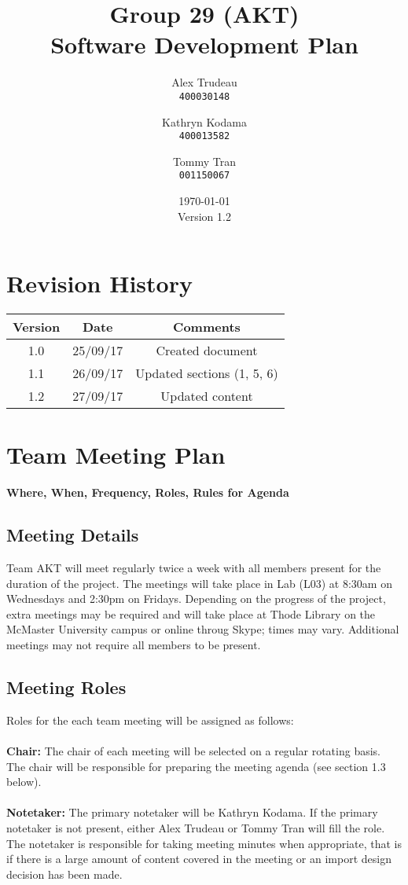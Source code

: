 \documentclass[12pt,fleqn]{article}
\title{Group 29 (AKT)\\ Software Development Plan}
\author{
Alex Trudeau\\
	\texttt{400030148}
\and
Kathryn Kodama\\
  	\texttt{400013582}
\and
Tommy Tran\\
	\texttt{001150067}
}
\date{\today\\Version 1.2}
\begin{document}
\maketitle

\pagebreak
\tableofcontents

\section* {Revision History}

\begin{tabular}{ |c| c| c| }
\hline
Version & Date & Comments \\
\hline
1.0 & 25/09/17 & Created document \\
\hline
1.1 & 26/09/17 & Updated sections (1, 5, 6) \\
\hline
1.2 & 27/09/17 & Updated content \\
\hline
\end{tabular}


\pagebreak

\section{Team Meeting Plan}
\textbf{Where, When, Frequency, Roles, Rules for Agenda}

\subsection{Meeting Details}

Team AKT will meet regularly twice a week with all members present for the duration of the project.  The meetings will take place in Lab (L03) at 8:30am on Wednesdays and 2:30pm on Fridays.  Depending on the progress of the project, extra meetings may be required and will take place at Thode Library on the McMaster University campus or online throug Skype; times may vary.  Additional meetings may not require all members to be present.

\subsection{Meeting Roles}
Roles for the each team meeting will be assigned as follows:\\ \\
\textbf{Chair:} The chair of each meeting will be selected on a regular rotating basis.  The chair will be responsible for preparing the meeting agenda (see section 1.3 below).\\ \\
\textbf{Notetaker:} The primary notetaker will be Kathryn Kodama.  If the primary notetaker is not present, either Alex Trudeau or Tommy Tran will fill the role.  The notetaker is responsible for taking meeting minutes when appropriate, that is if there is a large amount of content covered in the meeting or an import design decision has been made.  
\end{document}
